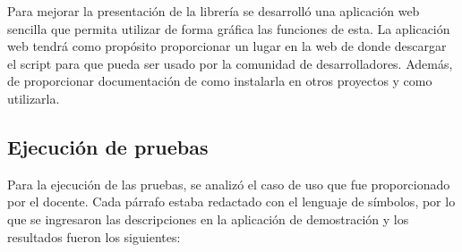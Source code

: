 Para mejorar la presentación de la librería se desarrolló una aplicación web sencilla que permita utilizar de forma gráfica las funciones de esta. La aplicación web tendrá como propósito proporcionar un lugar en la web de donde descargar el script para que pueda ser usado por la comunidad de desarrolladores. Además, de proporcionar documentación de como instalarla en otros proyectos y como utilizarla. 

\subsection{Ejecución de pruebas}

Para la ejecución de las pruebas, se analizó el caso de uso que fue proporcionado por el docente. Cada párrafo estaba redactado con el lenguaje de símbolos, por lo que se ingresaron las descripciones en la aplicación de demostración y los resultados fueron los siguientes:

